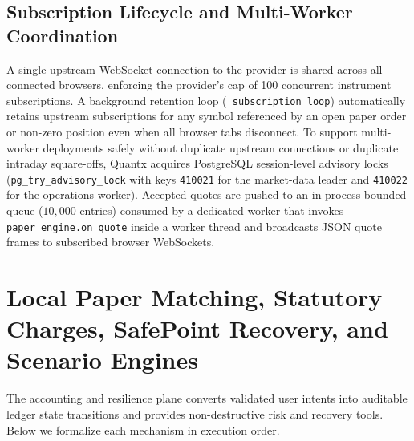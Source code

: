\documentclass[12pt]{article}
\begin{document}
\subsection{Subscription Lifecycle and Multi-Worker Coordination}
A single upstream WebSocket connection to the provider is shared across all connected browsers, enforcing the provider's cap of 100 concurrent instrument subscriptions. A background retention loop (\texttt{\_subscription\_loop}) automatically retains upstream subscriptions for any symbol referenced by an open paper order or non-zero position even when all browser tabs disconnect. To support multi-worker deployments safely without duplicate upstream connections or duplicate intraday square-offs, Quantx acquires PostgreSQL session-level advisory locks (\texttt{pg\_try\_advisory\_lock} with keys \texttt{410021} for the market-data leader and \texttt{410022} for the operations worker). Accepted quotes are pushed to an in-process bounded queue ($10{,}000$ entries) consumed by a dedicated worker that invokes \texttt{paper\_engine.on\_quote} inside a worker thread and broadcasts JSON quote frames to subscribed browser WebSockets.

\section{Local Paper Matching, Statutory Charges, SafePoint Recovery, and Scenario Engines}

The accounting and resilience plane converts validated user intents into auditable ledger state transitions and provides non-destructive risk and recovery tools. Below we formalize each mechanism in execution order.
\end{document}
